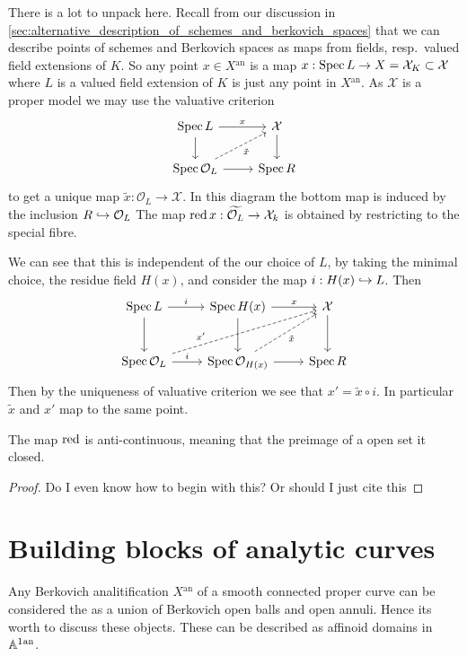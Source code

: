 \documentclass[a4paper]{article}
\newcommand{\an}{\ensuremath{{}^{\mathrm{an}}}}
\begin{document}
There is a lot to unpack here. Recall from our discussion in \cref{sec:alternative_description_of_schemes_and_berkovich_spaces} that we can describe points of schemes and Berkovich spaces as maps from fields, resp.\ valued field extensions of $K$. 
So any point $x \in X\an$ is a  map $x: \operatorname{Spec} L \to X = \mathcal{X} _K \subset \mathcal{X} $ where $L$ is a valued field extension of $K$ is just any point in $X\an$. 
As $\mathcal{X} $ is a proper model we may use the valuative criterion \[
\begin{tikzcd}
	\spec L \dar \rar{x} & \mathcal{X}  \dar \\
	\spec \mathcal{O}_L \urar[dashed,']{\tilde x} \rar & \spec R
\end{tikzcd}
\]  
to get a unique map $\tilde x: \mathcal{O}_L \to \mathcal{X}$.
In this diagram the bottom map is induced by the inclusion $R \hookrightarrow \mathcal{O}_L$
The map $\operatorname{red} x: \widetilde{\mathcal{O}_L} \to \mathcal{X} _k$ is obtained by restricting to the special fibre. 

We can see that this is independent of the our choice of $L$, by taking the minimal choice, the residue field $H(x)$, and consider the map $i:H(x) \hookrightarrow L$. 
Then \[
	\begin{tikzcd}[row sep = large]
		\spec L \rar{i} \dar & \spec H(x) \dar \rar{x} & \mathcal{X}  \dar \\
		\spec \mathcal{O}_L \rar{i} \ar[dashed]{urr}[near start]{x'} & \spec \mathcal{O}_{H(x)} \rar \urar[dashed,']{\tilde x} & \spec R
\end{tikzcd}
\]
Then by the uniqueness of valuative criterion we see that $x' = \tilde x \circ i$. In particular $\tilde x$ and $x'$ map to the same point. 

\begin{proposition}
	The map $\operatorname{red}$ is anti-continuous, meaning that the preimage of a open set it closed. 
\end{proposition}
\begin{proof}
	Do I even know how to begin with this? Or should I just cite this 
\end{proof}


\section{Building blocks of analytic curves} \label{sec:building_blocks_of_analytic_curves}

Any Berkovich analitification $X\an$ of a smooth connected proper curve can be considered the as a union of Berkovich open balls and open annuli. 
Hence its worth to discuss these objects. 
These can be described as affinoid domains in $\aff^{1}\an$. 
\end{document}
